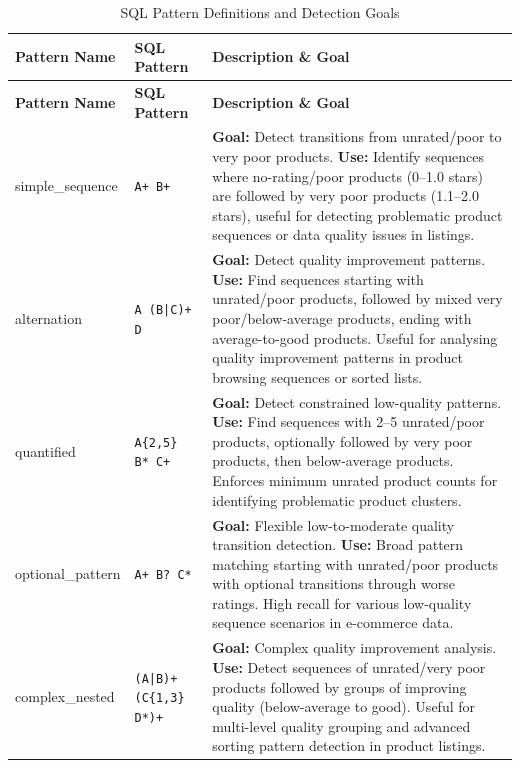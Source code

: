 {\small
\setlength{\LTleft}{0pt}
\setlength{\LTright}{0pt}
\begin{longtable}{@{\extracolsep{\fill}}llp{}}
\caption{SQL Pattern Definitions and Detection Goals}
\label{tab:pattern_definitions} \\
\toprule
\textbf{Pattern Name} & \textbf{SQL Pattern} & \textbf{Description \& Goal} \\
\midrule
\endfirsthead
\toprule
\textbf{Pattern Name} & \textbf{SQL Pattern} & \textbf{Description \& Goal} \\
\midrule
\endhead
\bottomrule
\endfoot

simple\_sequence & \texttt{A+ B+} &
\textbf{Goal:} Detect transitions from unrated/poor to very poor products.
\newline
\textbf{Use:} Identify sequences where no-rating/poor products (0--1.0
stars) are followed by very poor products (1.1--2.0 stars), useful for
detecting problematic product sequences or data quality issues in
listings. \\
\midrule

alternation & \texttt{A (B|C)+ D} &
\textbf{Goal:} Detect quality improvement patterns.
\newline
\textbf{Use:} Find sequences starting with unrated/poor products,
followed by mixed very poor/below-average products, ending with
average-to-good products.  Useful for analysing quality improvement
patterns in product browsing sequences or sorted lists. \\
\midrule

quantified & \texttt{A\{2,5\} B* C+} &
\textbf{Goal:} Detect constrained low-quality patterns.
\newline
\textbf{Use:} Find sequences with 2--5 unrated/poor products,
optionally followed by very poor products, then below-average products.
Enforces minimum unrated product counts for identifying problematic
product clusters. \\
\midrule

optional\_pattern & \texttt{A+ B? C*} &
\textbf{Goal:} Flexible low-to-moderate quality transition detection.
\newline
\textbf{Use:} Broad pattern matching starting with unrated/poor
products with optional transitions through worse ratings.  High recall
for various low-quality sequence scenarios in e-commerce data. \\
\midrule

complex\_nested & \texttt{(A|B)+ (C\{1,3\} D*)+} &
\textbf{Goal:} Complex quality improvement analysis.
\newline
\textbf{Use:} Detect sequences of unrated/very poor products followed
by groups of improving quality (below-average to good).  Useful for
multi-level quality grouping and advanced sorting pattern detection in
product listings. \\
\end{longtable}
}

